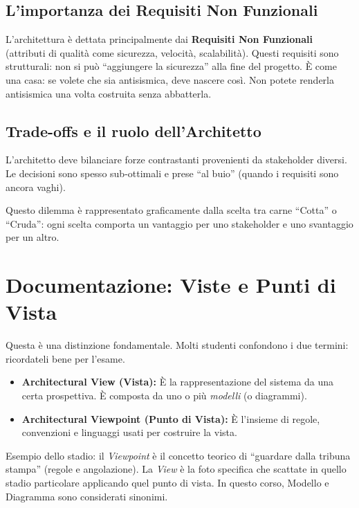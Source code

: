\subsection{L'importanza dei Requisiti Non Funzionali}
\begin{notaprof}
L'architettura è dettata principalmente dai \textbf{Requisiti Non Funzionali} (attributi di qualità come sicurezza, velocità, scalabilità). Questi requisiti sono strutturali: non si può ``aggiungere la sicurezza'' alla fine del progetto. È come una casa: se volete che sia antisismica, deve nascere così. Non potete renderla antisismica una volta costruita senza abbatterla.
\end{notaprof}

\subsection{Trade-offs e il ruolo dell'Architetto}
L'architetto deve bilanciare forze contrastanti provenienti da stakeholder diversi. Le decisioni sono spesso sub-ottimali e prese ``al buio'' (quando i requisiti sono ancora vaghi).
\begin{notaslide}
Questo dilemma è rappresentato graficamente dalla scelta tra carne ``Cotta'' o ``Cruda'': ogni scelta comporta un vantaggio per uno stakeholder e uno svantaggio per un altro.
\end{notaslide}

\section{Documentazione: Viste e Punti di Vista}
\begin{notaesame}
Questa è una distinzione fondamentale. Molti studenti confondono i due termini: ricordateli bene per l'esame.
\end{notaesame}

\begin{itemize}
    \item \textbf{Architectural View (Vista):} È la rappresentazione del sistema da una certa prospettiva. È composta da uno o più \textit{modelli} (o diagrammi).
    \item \textbf{Architectural Viewpoint (Punto di Vista):} È l'insieme di regole, convenzioni e linguaggi usati per costruire la vista.
\end{itemize}

\begin{notaprof}
Esempio dello stadio: il \textit{Viewpoint} è il concetto teorico di ``guardare dalla tribuna stampa'' (regole e angolazione). La \textit{View} è la foto specifica che scattate in quello stadio particolare applicando quel punto di vista. In questo corso, Modello e Diagramma sono considerati sinonimi.
\end{notaprof}

